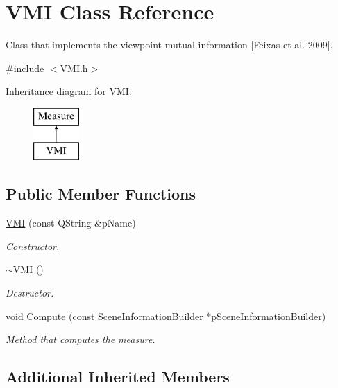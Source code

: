\hypertarget{class_v_m_i}{\section{V\+M\+I Class Reference}
\label{class_v_m_i}
}


Class that implements the viewpoint mutual information \mbox{[}Feixas et al. 2009\mbox{]}.  




{\ttfamily \#include $<$V\+M\+I.\+h$>$}

Inheritance diagram for V\+M\+I\+:\begin{figure}[H]
\begin{center}
\leavevmode
\includegraphics[height=2.000000cm]{class_v_m_i}
\end{center}
\end{figure}
\subsection*{Public Member Functions}
\begin{DoxyCompactItemize}
\item 
\hyperlink{class_v_m_i_a3144eee2c59877b37ec2b8deb39b12dd}{V\+M\+I} (const Q\+String \&p\+Name)
\begin{DoxyCompactList}\small\item\em Constructor. \end{DoxyCompactList}\item 
\hyperlink{class_v_m_i_af3092d24c52726a06fff131a8271809d}{$\sim$\+V\+M\+I} ()
\begin{DoxyCompactList}\small\item\em Destructor. \end{DoxyCompactList}\item 
void \hyperlink{class_v_m_i_a8c3a1cc5b7cd97e4d53464354a275960}{Compute} (const \hyperlink{class_scene_information_builder}{Scene\+Information\+Builder} $\ast$p\+Scene\+Information\+Builder)
\begin{DoxyCompactList}\small\item\em Method that computes the measure. \end{DoxyCompactList}\end{DoxyCompactItemize}
\subsection*{Additional Inherited Members}


